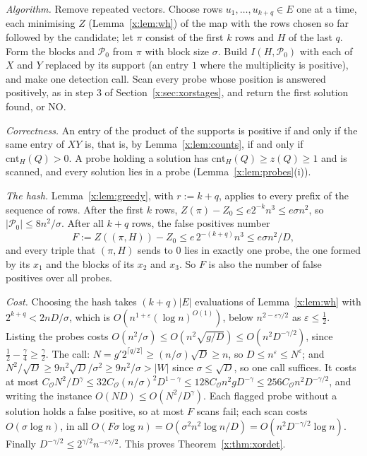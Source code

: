 \documentclass[11pt]{article}
\theoremstyle{definition}
\theoremstyle{remark}
\newcommand{\cnt}{\mathrm{cnt}}
\newcommand{\Pq}{\mathcal{P}}
\begin{document}
\emph{Algorithm.} Remove repeated vectors. Choose rows $u_1,\dots,u_{k+q}\in E$ one at a time, each minimising $Z$ (Lemma~\ref{x:lem:wh}) of the map with the rows chosen so far followed by the candidate; let $\pi$ consist of the first $k$ rows and $H$ of the last $q$. Form the blocks and $\Pq_0$ from $\pi$ with block size $\sigma$. Build $I(H,\Pq_0)$ with each of $X$ and $Y$ replaced by its support (an entry $1$ where the multiplicity is positive), and make one detection call. Scan every probe whose position is answered positively, as in step 3 of Section~\ref{x:sec:xorstages}, and return the first solution found, or NO.

\emph{Correctness.} An entry of the product of the supports is positive if and only if the same entry of $XY$ is, that is, by Lemma~\ref{x:lem:counts}, if and only if $\cnt_H(Q)>0$. A probe holding a solution has $\cnt_H(Q)\ge z(Q)\ge1$ and is scanned, and every solution lies in a probe (Lemma~\ref{x:lem:probes}(i)).

\emph{The hash.} Lemma~\ref{x:lem:greedy}, with $r:=k+q$, applies to every prefix of the sequence of rows. After the first $k$ rows, $Z(\pi)-Z_0\le e2^{-k}n^3\le e\sigma n^2$, so $|\Pq_0|\le8n^2/\sigma$. After all $k+q$ rows, the false positives number
\[
F:=Z((\pi,H))-Z_0\le e\,2^{-(k+q)}n^3\le e\sigma n^2/D,
\]
and every triple that $(\pi,H)$ sends to $0$ lies in exactly one probe, the one formed by its $x_1$ and the blocks of its $x_2$ and $x_3$. So $F$ is also the number of false positives over all probes.

\emph{Cost.} Choosing the hash takes $(k+q)|E|$ evaluations of Lemma~\ref{x:lem:wh} with $2^{k+q}<2nD/\sigma$, which is $O(n^{1+\varepsilon}(\log n)^{O(1)})$, below $n^{2-\varepsilon\gamma/2}$ as $\varepsilon\le\frac12$. Listing the probes costs $O(n^2/\sigma)\le O(n^2\sqrt{g/D})\le O(n^2D^{-\gamma/2})$, since $\frac12-\frac\gamma4\ge\frac\gamma2$. The call: $N=g'2^{\lceil q/2\rceil}\ge(n/\sigma)\sqrt D\ge n$, so $D\le n^\varepsilon\le N^\varepsilon$; and $N^2/\sqrt D\ge9n^2\sqrt D/\sigma^2\ge9n^2/\sigma>|W|$ since $\sigma\le\sqrt D$, so one call suffices. It costs at most $C_{\mathcal O}N^2/D^\gamma\le32C_{\mathcal O}(n/\sigma)^2D^{1-\gamma}\le128C_{\mathcal O}n^2gD^{-\gamma}\le256C_{\mathcal O}n^2D^{-\gamma/2}$, and writing the instance $O(ND)\le O(N^2/D^\gamma)$. Each flagged probe without a solution holds a false positive, so at most $F$ scans fail; each scan costs $O(\sigma\log n)$, in all $O(F\sigma\log n)=O(\sigma^2n^2\log n/D)=O(n^2D^{-\gamma/2}\log n)$. Finally $D^{-\gamma/2}\le2^{\gamma/2}n^{-\varepsilon\gamma/2}$. This proves Theorem~\ref{x:thm:xordet}.
\end{document}
